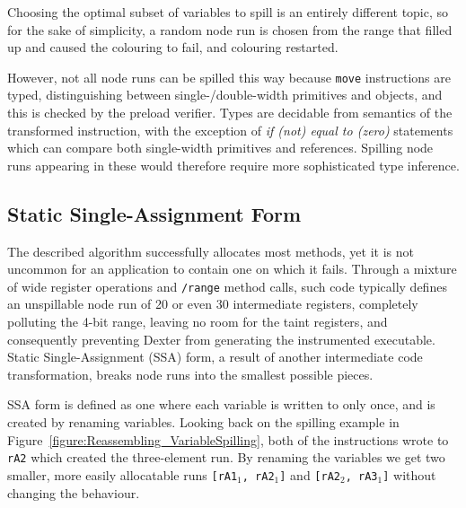 \documentclass[12pt,twoside,notitlepage]{report}
\begin{document}
Choosing the optimal subset of variables to spill is an entirely different topic, so for the sake of simplicity, a random node run is chosen from the range that filled up and caused the colouring to fail, and colouring restarted.

However, not all node runs can be spilled this way because \texttt{move} instructions are typed, distinguishing between single-/double-width primitives and objects, and this is checked by the preload verifier. Types are decidable from semantics of the transformed instruction, with the exception of \emph{if (not) equal to (zero)} statements which can compare both single-width primitives and references. Spilling node runs appearing in these would therefore require more sophisticated type inference.

\subsection{Static Single-Assignment Form}

The described algorithm successfully allocates most methods, yet it is not uncommon for an application to contain one on which it fails. Through a mixture of wide register operations and \texttt{/range} method calls, such code typically defines an unspillable node run of 20 or even 30 intermediate registers, completely polluting the 4-bit range, leaving no room for the taint registers, and consequently preventing Dexter from generating the instrumented executable. Static Single-Assignment (SSA) form, a result of another intermediate code transformation, breaks node runs into the smallest possible pieces.

SSA form is defined as one where each variable is written to only once, and is created by renaming variables. Looking back on the spilling example in Figure~\ref{figure:Reassembling_VariableSpilling}, both of the instructions wrote to \texttt{rA2} which created the three-element run. By renaming the variables we get two smaller, more easily allocatable runs \mbox{\texttt{{[}rA1$_1$, rA2$_1$]}} and \mbox{\texttt{{[}rA2$_2$, rA3$_1$]}} without changing the behaviour.
\end{document}
